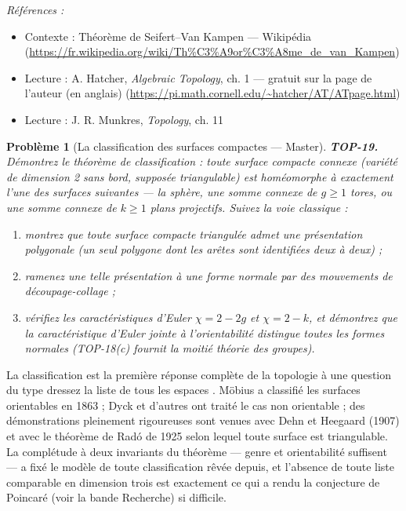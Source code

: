 \documentclass[11pt]{article}
\newtheorem{problem}{Problème}
\newenvironment{refs}{\par\small\noindent\emph{Références :}\begin{itemize}\setlength\itemsep{0pt}}{\end{itemize}\normalsize}
\begin{document}
\begin{refs}
\item Contexte : Théorème de Seifert--Van Kampen --- Wikipédia (\url{https://fr.wikipedia.org/wiki/Th%C3%A9or%C3%A8me_de_van_Kampen})
\item Lecture : A. Hatcher, \textit{Algebraic Topology}, ch. 1 --- gratuit sur la page de l'auteur (en anglais) (\url{https://pi.math.cornell.edu/~hatcher/AT/ATpage.html})
\item Lecture : J. R. Munkres, \textit{Topology}, ch. 11
\end{refs}

\bigskip

\begin{problem}[{La classification des surfaces compactes --- Master}]
\textbf{TOP-19.} Démontrez le théorème de classification : toute surface compacte connexe (variété
de dimension 2 sans bord, supposée triangulable) est homéomorphe à exactement l'une des surfaces
suivantes --- la sphère, une somme connexe de $ g \ge 1 $ tores, ou une somme connexe de $ k \ge 1 $
plans projectifs. Suivez la voie classique :
\begin{enumerate}
\item[(a)] montrez que toute surface compacte triangulée admet une présentation polygonale (un seul polygone
dont les arêtes sont identifiées deux à deux) ;
\item[(b)] ramenez une telle présentation à une forme normale par des mouvements de découpage-collage ;
\item[(c)] vérifiez les caractéristiques d'Euler $ \chi = 2 - 2g $ et $ \chi = 2 - k $, et démontrez que
la caractéristique d'Euler jointe à l'orientabilité distingue toutes les formes normales (TOP-18(c)
fournit la moitié théorie des groupes).
\end{enumerate}

\end{problem}

\noindent La classification est la première réponse complète de la topologie à une question du
type \og{} dressez la liste de tous les espaces \fg{}. Möbius a classifié les surfaces orientables en 1863 ; Dyck
et d'autres ont traité le cas non orientable ; des démonstrations pleinement rigoureuses sont venues avec
Dehn et Heegaard (1907) et avec le théorème de Radó de 1925 selon lequel toute surface est triangulable.
La complétude à deux invariants du théorème --- genre et orientabilité suffisent --- a fixé le modèle de toute
classification rêvée depuis, et l'absence de toute liste comparable en dimension trois est exactement ce
qui a rendu la conjecture de Poincaré (voir la bande Recherche) si difficile.
\end{document}
